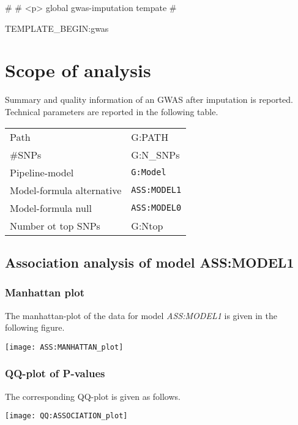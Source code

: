 #
#	<p> global gwas-imputation tempate
#

TEMPLATE_BEGIN:gwas
\tableofcontents
\newpage

\section{Scope of analysis}

Summary and quality information of an GWAS after imputation is reported. Technical parameters are reported in the following table.\par

\begin{longtable}{p{3cm}p{10cm}}
	\hline
	Path			& G:PATH\\
	\#SNPs			& G:N_SNPs\\
	Pipeline-model	& \texttt{G:Model}\\
	Model-formula alternative
					& \texttt{ASS:MODEL1}\\
	Model-formula null
					& \texttt{ASS:MODEL0}\\
	Number ot top SNPs
					& G:Ntop
	\hline
\end{longtable}

\subsection{Association analysis of model ASS:MODEL1}

\subsubsection{Manhattan plot}

The manhattan-plot of the data for model \emph{ASS:MODEL1} is given in the following figure.

\begin{center}
	\texttt{[image: ASS:MANHATTAN\_plot]}
\end{center}

\subsubsection{QQ-plot of P-values}

The corresponding QQ-plot is given as follows.

\begin{center}
	\texttt{[image: QQ:ASSOCIATION\_plot]}
\end{center}

